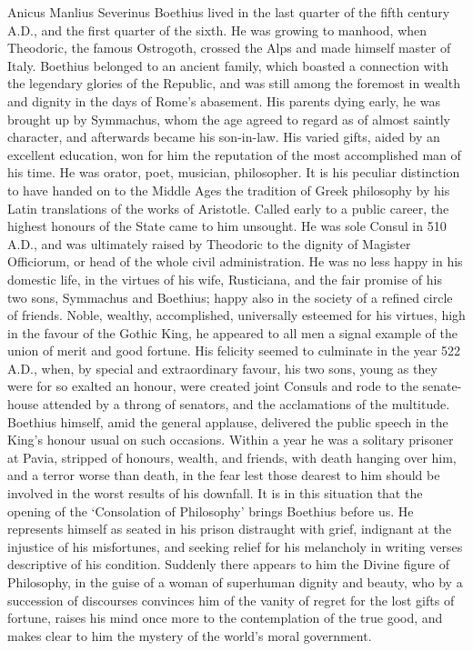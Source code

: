 \documentclass[11pt]{book}
\begin{document}
Anicus Manlius Severinus Boethius lived in the last quarter of the fifth
century A.D., and the first quarter of the sixth. He was growing to
manhood, when Theodoric, the famous Ostrogoth, crossed the Alps and made
himself master of Italy. Boethius belonged to an ancient family, which
boasted a connection with the legendary glories of the Republic, and was
still among the foremost in wealth and dignity in the days of Rome's
abasement. His parents dying early, he was brought up by Symmachus, whom
the age agreed to regard as of almost saintly character, and afterwards
became his son-in-law. His varied gifts, aided by an excellent
education, won for him the reputation of the most accomplished man of
his time. He was orator, poet, musician, philosopher. It is his peculiar
distinction to have handed on to the Middle Ages the tradition of Greek
philosophy by his Latin translations of the works of Aristotle. Called
early to a public career, the highest honours of the State came to him
unsought. He was sole Consul in 510 A.D., and was ultimately raised by
Theodoric to the dignity of Magister Officiorum, or head of the whole
civil administration. He was no less happy in his domestic life, in the
virtues of his wife, Rusticiana, and the fair promise of his two sons,
Symmachus and Boethius; happy also in the society of a refined circle of
friends. Noble, wealthy, accomplished, universally esteemed for his
virtues, high in the favour of the Gothic King, he appeared to all men a
signal example of the union of merit and good fortune. His felicity
seemed to culminate in the year 522 A.D., when, by special and
extraordinary favour, his two sons, young as they were for so exalted an
honour, were created joint Consuls and rode to the senate-house
attended by a throng of senators, and the acclamations of the multitude.
Boethius himself, amid the general applause, delivered the public speech
in the King's honour usual on such occasions. Within a year he was a
solitary prisoner at Pavia, stripped of honours, wealth, and friends,
with death hanging over him, and a terror worse than death, in the fear
lest those dearest to him should be involved in the worst results of his
downfall. It is in this situation that the opening of the `Consolation
of Philosophy' brings Boethius before us. He represents himself as
seated in his prison distraught with grief, indignant at the injustice
of his misfortunes, and seeking relief for his melancholy in writing
verses descriptive of his condition. Suddenly there appears to him the
Divine figure of Philosophy, in the guise of a woman of superhuman
dignity and beauty, who by a succession of discourses convinces him of
the vanity of regret for the lost gifts of fortune, raises his mind once
more to the contemplation of the true good, and makes clear to him the
mystery of the world's moral government.
\end{document}
